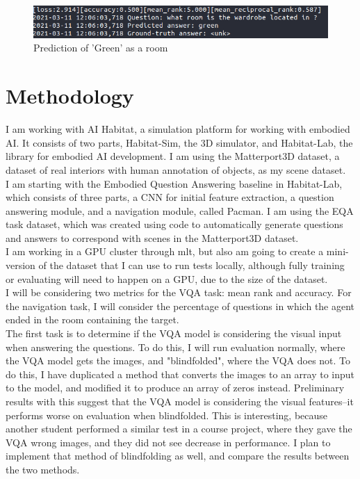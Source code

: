 \documentclass{article}
\begin{document}
\begin{figure}[h]
	\centering
	\includegraphics[width=\textwidth]{../error_images/green_room.png}
	\caption{Prediction of 'Green' as a room}
	\label{fig:Green}
\end{figure}

\section{Methodology}
I am working with AI Habitat, a simulation platform for working with embodied AI\cite{habitat19iccv}. It consists of two parts, Habitat-Sim, the 3D simulator, and Habitat-Lab, the library for embodied AI development. I am using the Matterport3D dataset, a dataset of real interiors with human annotation of objects, as my scene dataset\cite{matterport}. \\
I am starting with the Embodied Question Answering baseline in Habitat-Lab, which consists of three parts, a CNN for initial feature extraction, a question answering module, and a navigation module, called Pacman\cite{embodiedqa}. I am using the EQA task dataset, which was created using code to automatically generate questions and answers to correspond with scenes in the Matterport3D dataset\cite{eqa_matterport}. \\
I am working in a GPU cluster through mlt, but also am going to create a mini-version of the dataset that I can use to run tests locally, although fully training or evaluating will need to happen on a GPU, due to the size of the dataset. \\
I will be considering two metrics for the VQA task: mean rank and accuracy. For the navigation task, I will consider the percentage of questions in which the agent ended in the room containing the target. \\
The first task is to determine if the VQA model is considering the visual input when answering the questions. To do this, I will run evaluation normally, where the VQA model gets the images, and "blindfolded", where the VQA does not. To do this, I have duplicated a method that converts the images to an array to input to the model, and modified it to produce an array of zeros instead. Preliminary results with this suggest that the VQA model is considering the visual features--it performs worse on evaluation when blindfolded. This is interesting, because another student performed a similar test in a course project, where they gave the VQA wrong images, and they did not see decrease in performance. I plan to implement that method of blindfolding as well, and compare the results between the two methods. \\
\end{document}
